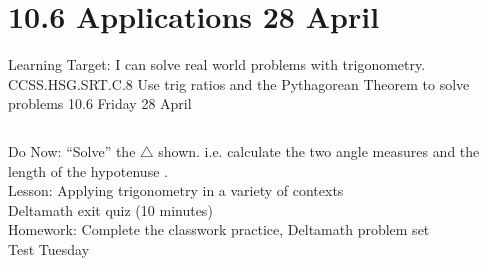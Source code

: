 \documentclass[onlytextwidth, aspectratio=169]{beamer}
\begin{document}
\section{10.6 Applications \hfill 28 April \,}
\begin{frame}{Learning Target: I can solve real world problems with trigonometry.}
  {CCSS.HSG.SRT.C.8 Use trig ratios and the Pythagorean Theorem to solve problems \hfill \alert{10.6 Friday 28 April}}
  \begin{columns}
    Do Now: ``Solve'' the $\triangle$ shown. i.e. calculate the two angle measures and the length of the hypotenuse . \\[0.5cm]
    Lesson: Applying trigonometry in a variety of contexts \\
    \alert{Deltamath exit quiz} (10 minutes) \\[0.5cm]
    Homework: Complete the classwork practice, Deltamath problem set \\
    \alert{Test Tuesday}
    \begin{flushright}
    \end{flushright}
  \end{columns}
\end{frame}
\end{document}
